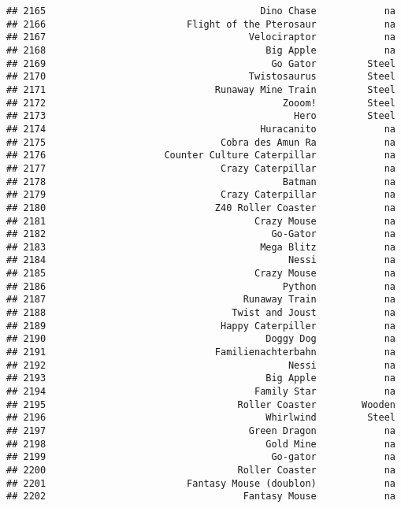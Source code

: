 \documentclass[
]{article}
\begin{document}
\begin{verbatim}
## 2165                                      Dino Chase            na
## 2166                         Flight of the Pterosaur            na
## 2167                                    Velociraptor            na
## 2168                                       Big Apple            na
## 2169                                        Go Gator         Steel
## 2170                                    Twistosaurus         Steel
## 2171                              Runaway Mine Train         Steel
## 2172                                          Zooom!         Steel
## 2173                                            Hero         Steel
## 2174                                      Huracanito            na
## 2175                               Cobra des Amun Ra            na
## 2176                     Counter Culture Caterpillar            na
## 2177                               Crazy Caterpillar            na
## 2178                                          Batman            na
## 2179                               Crazy Caterpillar            na
## 2180                              Z40 Roller Coaster            na
## 2181                                     Crazy Mouse            na
## 2182                                        Go-Gator            na
## 2183                                      Mega Blitz            na
## 2184                                           Nessi            na
## 2185                                     Crazy Mouse            na
## 2186                                          Python            na
## 2187                                   Runaway Train            na
## 2188                                 Twist and Joust            na
## 2189                               Happy Caterpiller            na
## 2190                                       Doggy Dog            na
## 2191                              Familienachterbahn            na
## 2192                                           Nessi            na
## 2193                                       Big Apple            na
## 2194                                     Family Star            na
## 2195                                  Roller Coaster        Wooden
## 2196                                       Whirlwind         Steel
## 2197                                    Green Dragon            na
## 2198                                       Gold Mine            na
## 2199                                        Go-gator            na
## 2200                                  Roller Coaster            na
## 2201                         Fantasy Mouse (doublon)            na
## 2202                                   Fantasy Mouse            na

\end{verbatim}
\end{document}
